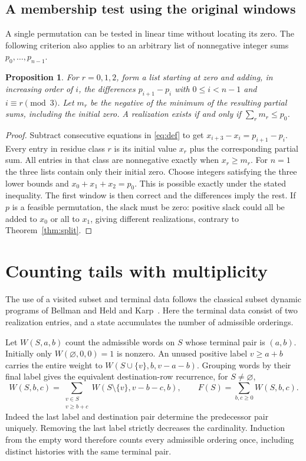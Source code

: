 \documentclass[11pt]{article}
\newtheorem{proposition}[theorem]{Proposition}
\begin{document}
\subsection{A membership test using the original windows}\label{sec:direct}

A single permutation can be tested in linear time without locating its
zero. The following criterion also applies to an arbitrary list of
nonnegative integer sums \(p_0,\ldots,p_{n-1}\).

\begin{proposition}\label{prop:direct}
For \(r=0,1,2\), form a list starting at zero and adding, in increasing
order of \(i\), the differences \(p_{i+1}-p_i\) with \(0\le i<n-1\)
and \(i\equiv r\pmod3\). Let \(m_r\) be the negative of the minimum
of the resulting partial sums, including the initial zero. A realization
exists if and only if \(\sum_r m_r\le p_0\).
\end{proposition}
\begin{proof}
Subtract consecutive equations in \eqref{eq:def} to get
\(x_{i+3}-x_i=p_{i+1}-p_i\). Every entry in residue class \(r\)
is its initial value \(x_r\) plus the corresponding partial sum.
All entries in that class are nonnegative exactly when \(x_r\ge m_r\).
For \(n=1\) the three lists contain only their initial zero.
Choose integers satisfying the three lower bounds and
\(x_0+x_1+x_2=p_0\). This is possible exactly under the stated inequality.
The first window is then correct and the differences imply the rest.
If \(p\) is a feasible permutation, the slack must be zero: positive
slack could all be added to \(x_0\) or all to \(x_1\), giving
different realizations, contrary to Theorem~\ref{thm:split}.
\end{proof}

\section{Counting tails with multiplicity}\label{sec:weights}

The use of a visited subset and terminal data follows the classical
subset dynamic programs of Bellman and Held and Karp~\cite{bellman,held}.
Here the terminal data consist of two realization entries, and a state
accumulates the number of admissible orderings.

Let \(W(S,a,b)\) count the admissible words on \(S\) whose terminal pair
is \((a,b)\). Initially only \(W(\varnothing,0,0)=1\) is nonzero.
An unused positive label \(v\ge a+b\) carries the entire weight to
\(W(S\cup\{v\},b,v-a-b)\). Grouping words by their final label gives
the equivalent destination-row recurrence, for \(S\ne\varnothing\),
\begin{equation}
 W(S,b,c)=\sum_{\substack{v\in S\\v\ge b+c}}
       W(S\setminus\{v\},v-b-c,b),\qquad
 F(S)=\sum_{b,c\ge0}W(S,b,c).
 \label{eq:pull}
\end{equation}
Indeed the last label and destination pair determine the predecessor
pair uniquely. Removing the last label strictly decreases the cardinality.
Induction from the empty word therefore counts every admissible ordering
once, including distinct histories with the same terminal pair.
\end{document}
